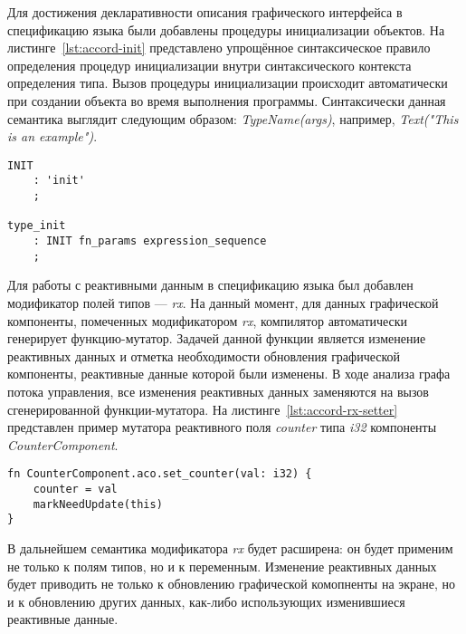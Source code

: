 Для достижения декларативности описания графического интерфейса в
спецификацию языка  были добавлены процедуры инициализации
объектов. На листинге~\ref{lst:accord-init} представлено упрощённое
синтаксическое правило определения процедур инициализации внутри
синтаксического контекста определения типа. Вызов процедуры инициализации
происходит автоматически при создании объекта во время выполнения программы.
Синтаксически данная семантика выглядит следующим образом:
\textit{TypeName(args)}, например, \textit{Text("This is an example")}.
\begin{lstlisting}[style=Antlr, caption=Синтаксическое правило процедур инициализации, label={lst:accord-init}]
INIT
	: 'init'
	;

type_init
	: INIT fn_params expression_sequence
	;
\end{lstlisting}

Для работы с реактивными данным в спецификацию языка  был
добавлен модификатор полей типов --- \textit{rx}. На данный момент, для
данных графической компоненты, помеченных модификатором \textit{rx},
компилятор автоматически генерирует функцию-мутатор. Задачей данной функции
является изменение реактивных данных и отметка необходимости обновления
графической компоненты, реактивные данные которой были изменены. В ходе
анализа графа потока управления, все изменения реактивных данных заменяются
на вызов сгенерированной функции-мутатора.
На листинге~\ref{lst:accord-rx-setter} представлен пример мутатора
реактивного поля \textit{counter} типа \textit{i32} компоненты
\textit{CounterComponent}.
\begin{lstlisting}[language=my_pseudo, caption=Пример функции-мутатора реактивных данных, label={lst:accord-rx-setter}]
fn CounterComponent.aco.set_counter(val: i32) {
    counter = val
    markNeedUpdate(this)
}
\end{lstlisting}
В дальнейшем семантика модификатора \textit{rx} будет расширена: он будет
применим не только к полям типов, но и к переменным. Изменение реактивных
данных будет приводить не только к обновлению графической комопненты на
экране, но и к обновлению других данных, как-либо использующих изменившиеся
реактивные данные.

